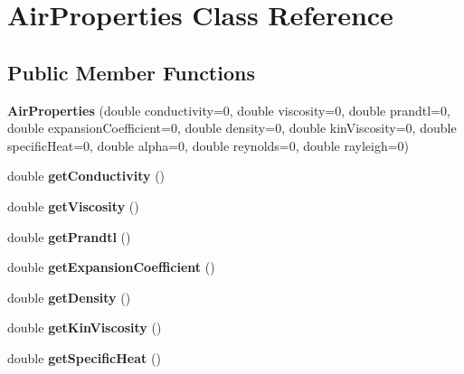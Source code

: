 \hypertarget{class_air_properties}{}\section{Air\+Properties Class Reference}
\label{class_air_properties}
\subsection*{Public Member Functions}
\begin{DoxyCompactItemize}
\item 
\mbox{\label{class_air_properties_a36a493e8472cb77f5810bdb00f46b980}} 
{\bfseries Air\+Properties} (double conductivity=0, double viscosity=0, double prandtl=0, double expansion\+Coefficient=0, double density=0, double kin\+Viscosity=0, double specific\+Heat=0, double alpha=0, double reynolds=0, double rayleigh=0)
\item 
\mbox{\label{class_air_properties_aed3b8e1d195b141e569885563a7059af}} 
double {\bfseries get\+Conductivity} ()
\item 
\mbox{\label{class_air_properties_afa27468d7215771f5bb8a9181234d6c0}} 
double {\bfseries get\+Viscosity} ()
\item 
\mbox{\label{class_air_properties_a448c8ea703d1e1a5cf73e30df0b9de8d}} 
double {\bfseries get\+Prandtl} ()
\item 
\mbox{\label{class_air_properties_ac6ea04ab5c76c2f9fd4c387077171ecb}} 
double {\bfseries get\+Expansion\+Coefficient} ()
\item 
\mbox{\label{class_air_properties_a13b2414ef175c1235c6404ae0d569291}} 
double {\bfseries get\+Density} ()
\item 
\mbox{\label{class_air_properties_ae5b3a7528ee3f6465381bfafd31d9089}} 
double {\bfseries get\+Kin\+Viscosity} ()
\item 
\mbox{\label{class_air_properties_ae488433b1f70ddee59dd695196a70891}} 
double {\bfseries get\+Specific\+Heat} ()
\item 

\end{DoxyCompactItemize}
